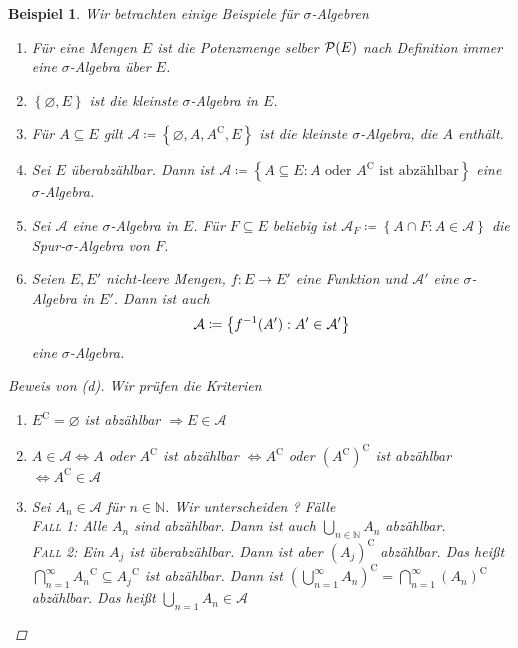 \documentclass[11pt, twoside, a4paper]{article}
\theoremstyle{plain}
\newtheorem{beispiel}[blockelement]{Beispiel}
\numberwithin{equation}{subsection}
\newcommand{\set}[1]{\left\{#1\right\}}
\newcommand{\pair}[1]{\left(#1\right)}
\newcommand{\of}[1]{\mathopen{}\mathclose{}\bgroup\left(#1\aftergroup\egroup\right)}
\newcommand{\equivalent}[0]{\Leftrightarrow{}}
\newcommand{\impl}[0]{\Rightarrow{}}
\renewcommand{\emptyset}{\varnothing}
\newcommand{\comp}[1]{{#1}^{\mathrm{C}}}
\newcommand{\N}{\mathbb{N}}
\begin{document}
    \begin{beispiel}
        Wir betrachten einige Beispiele für $\sigma$-Algebren
        \begin{enumerate}[label=(\alph*)]
            \item Für eine Mengen $E$ ist die Potenzmenge selber $\mathcal{P}\of{E}$ nach Definition immer eine $\sigma$-Algebra über $E$.
            \item $\set{\emptyset, E}$ ist die kleinste $\sigma$-Algebra in $E$.
            \item Für $A \subseteq E$ gilt $\mathcal{A} \coloneqq \set{\emptyset, A, \comp{A}, E}$ ist die kleinste $\sigma$-Algebra, die $A$ enthält.
            \item Sei $E$ überabzählbar. Dann ist $\mathcal{A} \coloneqq \set{A\subseteq E: A \text{ oder }\comp{A}\text{ ist abzählbar}}$ eine $\sigma$-Algebra.
            \item Sei $\mathcal{A}$ eine $\sigma$-Algebra in $E$. Für $F\subseteq E$ beliebig ist $\mathcal{A}_F \coloneqq \set{A \cap F: A\in\mathcal{A}}$ die Spur-$\sigma$-Algebra von $F$.
            \item Seien $E, E'$ nicht-leere Mengen, $f: E\to E'$ eine Funktion und $\mathcal{A}'$ eine $\sigma$-Algebra in $E'$. Dann ist auch
            \begin{align*}
                \mathcal{A} \coloneqq \set{f^{-1}\of{A'}: A'\in\mathcal{A}'}
            \end{align*}
            eine $\sigma$-Algebra.
        \end{enumerate}

        \begin{proof}[Beweis von (d)]
            Wir prüfen die Kriterien
            \begin{enumerate}[label=(\roman*)]
                \item $\comp{E} = \emptyset$ ist abzählbar $\impl E\in\mathcal{A}$
                \item $A\in\mathcal{A} \equivalent A$ oder $\comp{A}$ ist abzählbar $\equivalent \comp{A}$ oder $\comp{\pair{\comp{A}}}$ ist abzählbar $\equivalent \comp{A} \in\mathcal{A}$
                \item Sei $A_n \in\mathcal{A}$ für $n\in\N$. Wir unterscheiden ? Fälle\\
                \textsc{Fall 1}: Alle $A_n$ sind abzählbar. Dann ist auch $\bigcup_{n\in\N} A_n$ abzählbar.\\
                \textsc{Fall 2}: Ein $A_j$ ist überabzählbar. Dann ist aber $\comp{\pair{A_j}}$ abzählbar. Das heißt $\bigcap_{n=1}^{\infty} \comp{A_n} \subseteq \comp{A_j}$ ist abzählbar. Dann ist $\comp{\pair{\bigcup_{n=1}^{\infty} A_n}} = \bigcap_{n=1}^{\infty} \comp{\pair{A_n}}$ abzählbar. Das heißt $\bigcup_{n=1} A_n \in\mathcal{A}$
            \end{enumerate}
        \end{proof}
    \end{beispiel}
\end{document}

